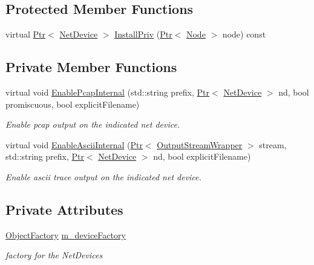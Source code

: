 \subsection*{Protected Member Functions}
\begin{DoxyCompactItemize}
\item 
virtual \hyperlink{classns3_1_1Ptr}{Ptr}$<$ \hyperlink{classns3_1_1NetDevice}{Net\+Device} $>$ \hyperlink{classns3_1_1FdNetDeviceHelper_adf0e4f64b03f7203f7080b50f412a970}{Install\+Priv} (\hyperlink{classns3_1_1Ptr}{Ptr}$<$ \hyperlink{classns3_1_1Node}{Node} $>$ node) const 
\end{DoxyCompactItemize}
\subsection*{Private Member Functions}
\begin{DoxyCompactItemize}
\item 
virtual void \hyperlink{classns3_1_1FdNetDeviceHelper_ad2438701b5de250057f690ad9c88a693}{Enable\+Pcap\+Internal} (std\+::string prefix, \hyperlink{classns3_1_1Ptr}{Ptr}$<$ \hyperlink{classns3_1_1NetDevice}{Net\+Device} $>$ nd, bool promiscuous, bool explicit\+Filename)
\begin{DoxyCompactList}\small\item\em Enable pcap output on the indicated net device. \end{DoxyCompactList}\item 
virtual void \hyperlink{classns3_1_1FdNetDeviceHelper_ae302a206158bfda94ddea64b711854d2}{Enable\+Ascii\+Internal} (\hyperlink{classns3_1_1Ptr}{Ptr}$<$ \hyperlink{classns3_1_1OutputStreamWrapper}{Output\+Stream\+Wrapper} $>$ stream, std\+::string prefix, \hyperlink{classns3_1_1Ptr}{Ptr}$<$ \hyperlink{classns3_1_1NetDevice}{Net\+Device} $>$ nd, bool explicit\+Filename)
\begin{DoxyCompactList}\small\item\em Enable ascii trace output on the indicated net device. \end{DoxyCompactList}\end{DoxyCompactItemize}
\subsection*{Private Attributes}
\begin{DoxyCompactItemize}
\item 
\hyperlink{classns3_1_1ObjectFactory}{Object\+Factory} \hyperlink{classns3_1_1FdNetDeviceHelper_a68ff62237281b17bbd72fde746ce6826}{m\+\_\+device\+Factory}
\begin{DoxyCompactList}\small\item\em factory for the Net\+Devices \end{DoxyCompactList}\end{DoxyCompactItemize}


